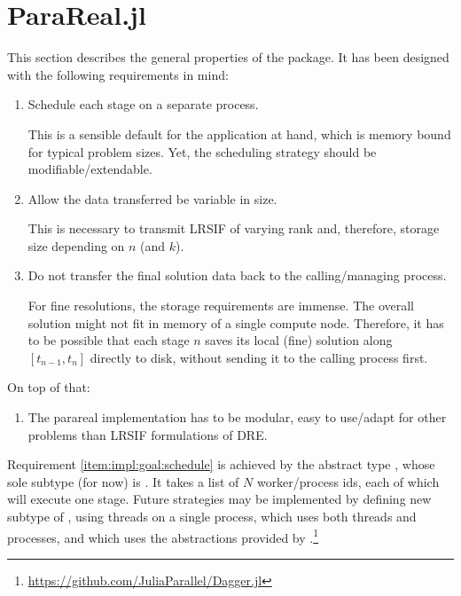 \section{ParaReal.jl}
\label{sec:impl:pr}

This section describes the general properties of the  package.
It has been designed with the following requirements in mind:
\begin{enumerate}
  \item\label{item:impl:goal:schedule}
    Schedule each stage on a separate process.

    This is a sensible default for the application at hand,
    which is memory bound for typical problem sizes.
    Yet, the scheduling strategy should be modifiable/extendable.
  \item\label{item:impl:goal:variablesize}
    Allow the data transferred be variable in size.

    This is necessary to transmit \ac{LRSIF} of varying rank and, therefore, storage size depending on $n$ (and $k$).
  \item\label{item:impl:goal:notransfer}
    Do not transfer the final solution data back to the calling/managing process.

    For fine resolutions, the storage requirements are immense.
    The overall solution might not fit in memory of a single compute node.
    Therefore, it has to be possible that each stage $n$ saves its local (fine) solution along $[t_{n-1},t_n]$ directly to disk,
    without sending it to the calling process first.
\end{enumerate}
On top of that:
\begin{enumerate}[resume]
  \item\label{item:impl:goal:modularity}
    The parareal implementation has to be modular,
    \ie easy to use/adapt for other problems than \ac{LRSIF} formulations of \ac{DRE}.
\end{enumerate}

Requirement \ref{item:impl:goal:schedule} is achieved by the abstract type ,
whose sole subtype (for now) is .
It takes a list of $N$ worker/process ids, each of which will execute one stage.
Future strategies may be implemented by defining new subtype of , \eg
{} using threads on a single process,
 which uses both threads and processes, and
 which uses the abstractions provided by .\footnote{\url{https://github.com/JuliaParallel/Dagger.jl}}

